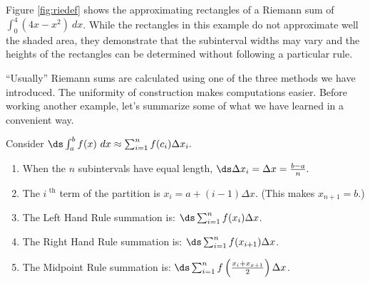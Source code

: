 Figure \ref{fig:riedef} shows the approximating rectangles of a Riemann sum of $\int_0^4(4x-x^2)\ dx$. While the rectangles in this example do not approximate well the shaded area, they demonstrate that the subinterval widths may vary and the heights of the rectangles can be determined without following a particular rule.

``Usually'' Riemann sums are calculated using one of the three methods we have introduced. The uniformity of construction  makes computations easier. Before working another example, let's summarize some of what we have learned in a convenient way.

{Consider $\ds \int_a^b f(x) \ dx \approx \sum_{i=1}^n f(c_i)\Delta x_i.$ 

\begin{enumerate}
\item	When the $n$ subintervals have equal length, $\ds \Delta x_i = \Delta x = \frac{b-a}n.$
\item		The $i^\text{ th}$ term of the partition is $x_i = a + (i-1)\Delta x$. (This makes $x_{n+1} = b$.)
\item		The Left Hand Rule summation is: $\ds \sum_{i=1}^n f(x_i)\Delta x$.
\item		The Right Hand Rule summation is: $\ds \sum_{i=1}^n f(x_{i+1})\Delta x$.
\item		The Midpoint Rule summation is: $\ds \sum_{i=1}^n f\left(\frac{x_i+x_{x+1}}{2}\right)\Delta x$.
\end{enumerate}
}
\restoreboxwidth
%
%
%


